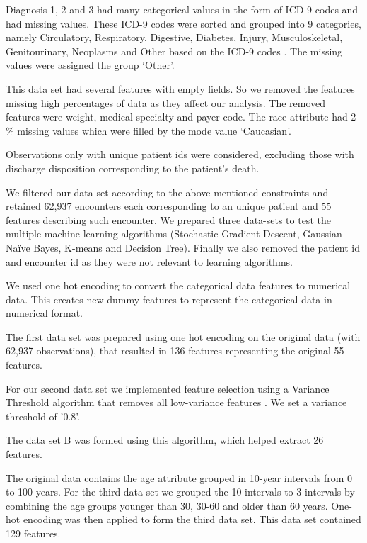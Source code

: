 \documentclass[9pt,twocolumn,twoside]{../../styles/osajnl}
\begin{document}
Diagnosis 1, 2 and 3 had many categorical values in the form of ICD-9 codes and had missing values. These ICD-9 codes were sorted and grouped into 9 categories, namely Circulatory, Respiratory, Digestive, Diabetes, Injury, Musculoskeletal, Genitourinary, Neoplasms and Other based on the ICD-9 codes \cite{article-hindawi}. The missing values were assigned the group ‘Other’.

This data set had several  features with empty fields. So we removed the features missing high percentages of data as they affect our analysis. The removed  features were weight, medical specialty and payer code. The race attribute had 2$\%$ missing values which were filled by the mode value ‘Caucasian’.

Observations only with unique patient ids were considered, excluding those with discharge disposition corresponding to the patient’s death.

We filtered our data set according to the above-mentioned constraints and retained  62,937 encounters each corresponding to an unique patient and 55 features describing such encounter. We prepared three data-sets to test the multiple machine learning algorithms (Stochastic Gradient Descent, Gaussian Naïve Bayes, K-means and Decision Tree).  Finally we also removed the patient id and encounter id  as they were not relevant to learning algorithms.

We used one hot encoding to convert the categorical data features  to numerical data. This creates new dummy features to represent the categorical data in numerical format.

The first data set was prepared using one hot encoding on the original data (with 62,937 observations), that resulted in 136 features representing the original 55 features.

For our second data set we implemented feature selection using a Variance Threshold algorithm that removes all low-variance features \cite{www-vt}. We set a variance threshold of '0.8'.

The data set B was formed using this algorithm, which helped extract 26 features.

The original data contains the age attribute grouped in 10-year intervals from 0 to 100 years. For the third data set we grouped the 10 intervals to 3 intervals by combining the age groups younger than 30, 30-60 and older than 60 years. One-hot encoding was then applied to form the third data set. This data set contained 129 features.
\end{document}
